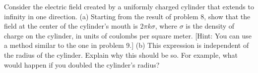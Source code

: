  Consider the electric field created by a uniformly
charged cylinder that extends to infinity in one direction.
(a) Starting from the result of problem 8, show that the
field at the center of the cylinder's mouth is $2\pi k\sigma$,
 where $\sigma$ is the density of charge on
the cylinder, in units of coulombs per square meter. [Hint:
You can use a method similar to the one in problem 9.] (b)
This expression is independent of the radius of the
cylinder. Explain why this should be so. For example, what
would happen if you doubled the cylinder's radius?
